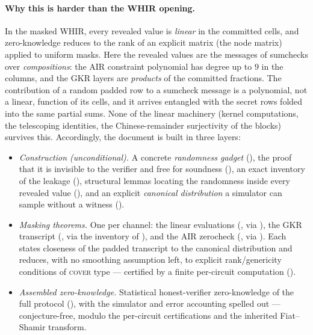 \documentclass{article}
\theoremstyle{definition}
\begin{document}
\paragraph{Why this is harder than the WHIR opening.} In the masked WHIR, every revealed value is \emph{linear} in the committed cells, and zero-knowledge reduces to the rank of an explicit matrix (the node matrix) applied to uniform masks. Here the revealed values are the messages of sumchecks over \emph{compositions}: the AIR constraint polynomial has degree up to $9$ in the columns, and the GKR layers are \emph{products} of the committed fractions. The contribution of a random padded row to a sumcheck message is a polynomial, not a linear, function of its cells, and it arrives entangled with the secret rows folded into the same partial sums. None of the linear machinery (kernel computations, the telescoping identities, the Chinese-remainder surjectivity of the blocks) survives this. Accordingly, the document is built in three layers:
\begin{itemize}
    \item \emph{Construction (unconditional).} A concrete \emph{randomness gadget} (), the proof that it is invisible to the verifier and free for soundness (), an exact inventory of the leakage (), structural lemmas locating the randomness inside every revealed value (), and an explicit \emph{canonical distribution} a simulator can sample without a witness ().
    \item \emph{Masking theorems.} One per channel: the linear evaluations (, via ), the GKR transcript (, via the inventory of ), and the AIR zerocheck (, via ). Each states closeness of the padded transcript to the canonical distribution and reduces, with no smoothing assumption left, to explicit rank/genericity conditions of \textsc{cover} type --- certified by a finite per-circuit computation ().
    \item \emph{Assembled zero-knowledge.} Statistical honest-verifier zero-knowledge of the full protocol (), with the simulator and error accounting spelled out --- conjecture-free, modulo the per-circuit certifications and the inherited Fiat--Shamir transform.
\end{itemize}
\end{document}
